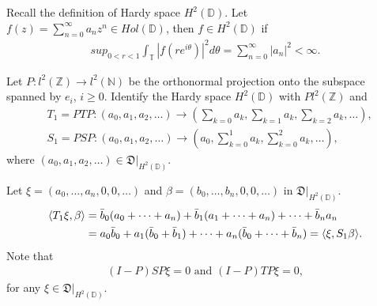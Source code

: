 \documentclass[a4paper,10pt]{amsart}
\newcommand{\DDD}{\mathfrak D}
\newcommand{\Z}{\mathbb Z} %
\newcommand{\N}{\mathbb N} %
\newcommand{\Hd}{H^{2}(\mathbb{D})}
\begin{document}
Recall the definition of Hardy space $\Hd$. Let 
$f(z) = \sum_{n=0}^{\infty} a_n z^n \in Hol(\mathbb{D})$,
then $f \in \Hd$ if 
\begin{align*}
    sup_{0 < r < 1}\int_{\mathbb{T}} |f(re^{i\theta})|^2 d\theta
= \sum_{n=0}^{\infty} |a_n|^2 < \infty. 
\end{align*}

Let $P: l^{2}(\Z) \to l^{2}(\N)$ be the orthonormal projection onto
the subspace spanned by $e_i$, $i \geq 0$.
Identify the Hardy space $\Hd$ with $Pl^{2}(\Z)$ and 
\begin{align*}
    &T_1 = PTP : (a_0, a_1, a_2, \ldots ) \to (\sum_{k=0}a_k,\sum_{k=1}a_k,
    \sum_{k=2}a_k, \ldots), \\
    &S_1 = PSP : (a_0, a_1, a_2, \ldots ) \to (a_0,\sum_{k=0}^{1}a_k,
    \sum_{k=0}^{2}a_k, \ldots),
\end{align*}
where $(a_0, a_1, a_2, \ldots) \in \DDD|_{\Hd}$.

Let $\xi = (a_0, \ldots, a_n, 0, 0, \ldots)$ 
and $\beta = (b_0, \ldots, b_n, 0, 0, \ldots)$ in $\DDD|_{\Hd}$.
\begin{align*}
    \langle T_1 \xi, \beta \rangle &= \Bar{b}_{0}(a_0 + \cdots + a_n)
    + \Bar{b}_{1}(a_1 + \cdots + a_n) + \cdots + \Bar{b}_{n}a_n \\
    & = a_{0}\Bar{b}_{0} + a_{1}(\Bar{b}_{0} + \Bar{b}_{1}) + \cdots + 
    a_{n}(\Bar{b}_{0} + \cdots + \Bar{b}_{n}) = 
    \langle \xi, S_1 \beta \rangle.
\end{align*}
Note that 
\begin{align*}
    (I-P)SP\xi = 0 \mbox{ and } (I-P)TP \xi = 0, 
\end{align*} 
for any $\xi \in \DDD|_{\Hd}$.
\end{document}
